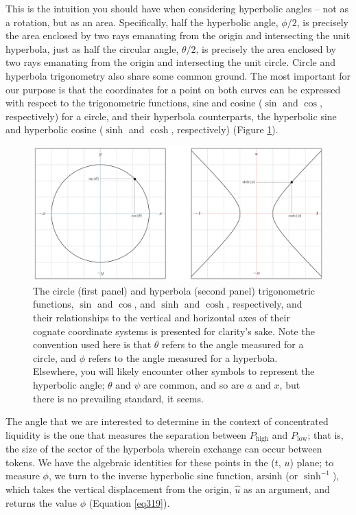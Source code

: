 \documentclass{article}
\begin{document}
This is the intuition you should have when considering hyperbolic angles – not as a rotation, but as an area. Specifically, half the hyperbolic angle, $\phi / 2$, is precisely the area enclosed by two rays emanating from the origin and intersecting the unit hyperbola, just as half the circular angle, $\theta / 2$, is precisely the area enclosed by two rays emanating from the origin and intersecting the unit circle. Circle and hyperbola trigonometry also share some common ground. The most important for our purpose is that the coordinates for a point on both curves can be expressed with respect to the trigonometric functions, sine and cosine ($\sin$ and $\cos$, respectively) for a circle, and their hyperbola counterparts, the hyperbolic sine and hyperbolic cosine ($\sinh$ and $\cosh$, respectively) (Figure \ref{fig55}). 

\begin{figure}[ht]
    \centering
    \includegraphics[width=\textwidth]{fig55.png}
    \captionsetup{
        justification=raggedright,
        singlelinecheck=false,
        font=small,
        labelfont=bf,
        labelsep=quad,
        format=plain
    }
    \caption{The circle (first panel) and hyperbola (second panel) trigonometric functions, $\sin$ and $\cos$, and $\sinh$ and $\cosh$, respectively, and their relationships to the vertical and horizontal axes of their cognate coordinate systems is presented for clarity’s sake. Note the convention used here is that $\theta$ refers to the angle measured for a circle, and $\phi$ refers to the angle measured for a hyperbola. Elsewhere, you will likely encounter other symbols to represent the hyperbolic angle; $\theta$ and $\psi$ are common, and so are $a$ and $x$, but there is no prevailing standard, it seems.}
    \label{fig55}
\end{figure}

The angle that we are interested to determine in the context of concentrated liquidity is the one that measures the separation between $P_{\text{high}}$ and $P_{\text{low}}$; that is, the size of the sector of the hyperbola wherein exchange can occur between tokens. We have the algebraic identities for these points in the ($t$, $u$) plane; to measure $\phi$, we turn to the inverse hyperbolic sine function, $\text{arsinh}$ (or $\sinh^{-1}$), which takes the vertical displacement from the origin, $\hat{u}$ as an argument, and returns the value $\phi$ (Equation \ref{eq319}). 
\end{document}
